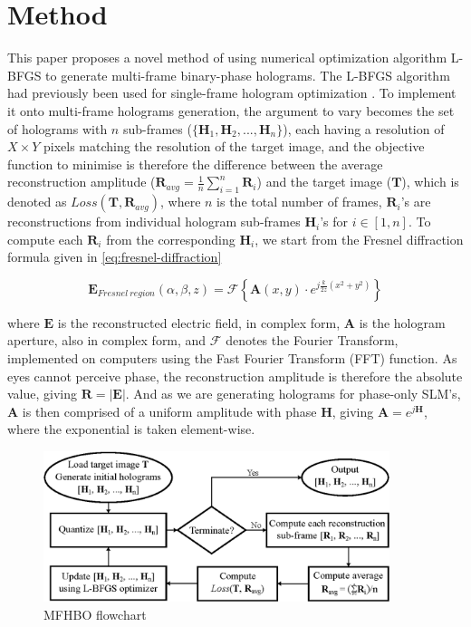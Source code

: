 \section{Method}
	This paper proposes a novel method of using numerical optimization algorithm L-BFGS \cite{Liu1989} to generate multi-frame binary-phase holograms. The L-BFGS algorithm had previously been used for single-frame hologram optimization \cite{Sha2022, Sha2023}. To implement it onto multi-frame holograms generation, the argument to vary becomes the set of holograms with $n$ sub-frames ($\{\textbf{H}_1, \textbf{H}_2, ..., \textbf{H}_n\}$), each having a resolution of $X\times Y$ pixels matching the resolution of the target image, and the objective function to minimise is therefore the difference between the average reconstruction amplitude ($\textbf{R}_{avg}=\frac{1}{n}\sum_{i=1}^n\textbf{R}_i$) and the target image ($\textbf{T}$), which is denoted as $Loss(\textbf{T}, \textbf{R}_{avg})$, where $n$ is the total number of frames, $\textbf{R}_i$'s are reconstructions from individual hologram sub-frames $\textbf{H}_i$'s for $i\in[1,n]$. To compute each $\textbf{R}_i$ from the corresponding $\textbf{H}_i$, we start from the Fresnel diffraction formula given in \cref{eq:fresnel-diffraction} \cite{Goodman2017}
	
	\begin{equation}
	  \textbf{E}_{Fresnel\ region}(\alpha, \beta, z) = \mathcal{F} \left\{\textbf{A}(x,y) \cdot e^{j\frac{k}{2z}(x^2+y^2)}\right\} \label{eq:fresnel-diffraction}
	\end{equation}
	
	where $\textbf{E}$ is the reconstructed electric field, in complex form, $\textbf{A}$ is the hologram aperture, also in complex form, and $\mathcal{F}$ denotes the Fourier Transform, implemented on computers using the Fast Fourier Transform (FFT) function. As eyes cannot perceive phase, the reconstruction amplitude is therefore the absolute value, giving $\textbf{R} = \left\lvert \textbf{E} \right\rvert$. And as we are generating holograms for phase-only SLM's, $\textbf{A}$ is then comprised of a uniform amplitude with phase \textbf{H}, giving $\textbf{A} = e^{j\textbf{H}}$, where the exponential is taken element-wise. 
	
	\begin{figure}[h!t]
		\centering
		\includegraphics[width=0.9\textwidth]{MFHO_flowchart.eps}
		\caption{MFHBO flowchart}
		\label{fig:MFHO_flowchart}
	\end{figure}
	
